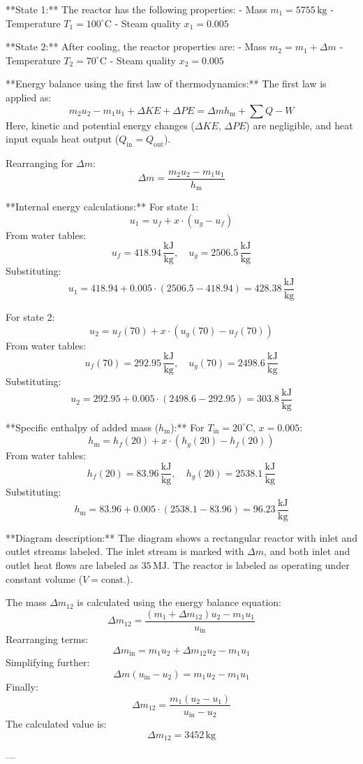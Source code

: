 **State 1:**  
The reactor has the following properties:  
- Mass \( m_1 = 5755 \, \text{kg} \)  
- Temperature \( T_1 = 100^\circ\text{C} \)  
- Steam quality \( x_1 = 0.005 \)  

**State 2:**  
After cooling, the reactor properties are:  
- Mass \( m_2 = m_1 + \Delta m \)  
- Temperature \( T_2 = 70^\circ\text{C} \)  
- Steam quality \( x_2 = 0.005 \)  

**Energy balance using the first law of thermodynamics:**  
The first law is applied as:  
\[
m_2 u_2 - m_1 u_1 + \Delta KE + \Delta PE = \Delta m h_{\text{m}} + \sum Q - W
\]  
Here, kinetic and potential energy changes (\( \Delta KE \), \( \Delta PE \)) are negligible, and heat input equals heat output (\( Q_{\text{in}} = Q_{\text{out}} \)).  

Rearranging for \( \Delta m \):  
\[
\Delta m = \frac{m_2 u_2 - m_1 u_1}{h_{\text{m}}}
\]  

**Internal energy calculations:**  
For state 1:  
\[
u_1 = u_f + x \cdot (u_g - u_f)
\]  
From water tables:  
\[
u_f = 418.94 \, \frac{\text{kJ}}{\text{kg}}, \quad u_g = 2506.5 \, \frac{\text{kJ}}{\text{kg}}
\]  
Substituting:  
\[
u_1 = 418.94 + 0.005 \cdot (2506.5 - 418.94) = 428.38 \, \frac{\text{kJ}}{\text{kg}}
\]  

For state 2:  
\[
u_2 = u_f(70) + x \cdot (u_g(70) - u_f(70))
\]  
From water tables:  
\[
u_f(70) = 292.95 \, \frac{\text{kJ}}{\text{kg}}, \quad u_g(70) = 2498.6 \, \frac{\text{kJ}}{\text{kg}}
\]  
Substituting:  
\[
u_2 = 292.95 + 0.005 \cdot (2498.6 - 292.95) = 303.8 \, \frac{\text{kJ}}{\text{kg}}
\]  

**Specific enthalpy of added mass (\( h_{\text{m}} \)):**  
For \( T_{\text{in}} = 20^\circ\text{C} \), \( x = 0.005 \):  
\[
h_{\text{m}} = h_f(20) + x \cdot (h_g(20) - h_f(20))
\]  
From water tables:  
\[
h_f(20) = 83.96 \, \frac{\text{kJ}}{\text{kg}}, \quad h_g(20) = 2538.1 \, \frac{\text{kJ}}{\text{kg}}
\]  
Substituting:  
\[
h_{\text{m}} = 83.96 + 0.005 \cdot (2538.1 - 83.96) = 96.23 \, \frac{\text{kJ}}{\text{kg}}
\]  

**Diagram description:**  
The diagram shows a rectangular reactor with inlet and outlet streams labeled. The inlet stream is marked with \( \Delta m \), and both inlet and outlet heat flows are labeled as \( 35 \, \text{MJ} \). The reactor is labeled as operating under constant volume (\( V = \text{const.} \)).

The mass \( \Delta m_{12} \) is calculated using the energy balance equation:  
\[
\Delta m_{12} = \frac{(m_1 + \Delta m_{12}) u_2 - m_1 u_1}{u_{\text{in}}}
\]  
Rearranging terms:  
\[
\Delta m_{\text{in}} = m_1 u_2 + \Delta m_{12} u_2 - m_1 u_1
\]  
Simplifying further:  
\[
\Delta m (u_{\text{in}} - u_2) = m_1 u_2 - m_1 u_1
\]  
Finally:  
\[
\Delta m_{12} = \frac{m_1 (u_2 - u_1)}{u_{\text{in}} - u_2}
\]  
The calculated value is:  
\[
\Delta m_{12} = 3452 \, \text{kg}
\]  

---